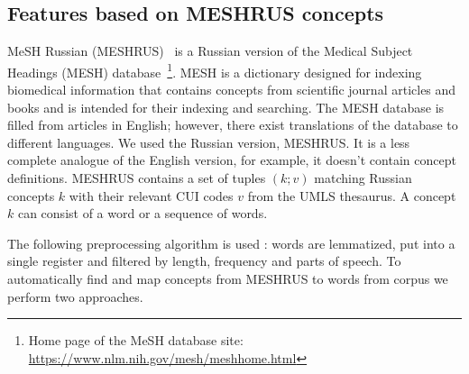 \documentclass[a4paper,fleqn,longmktitle]{cas-dc}
\begin{document}
\subsection*{Features based on MESHRUS concepts}\label{subsec:meshrus_features}
 MeSH Russian (MESHRUS)~\cite{NLM} is a Russian version of the Medical Subject Headings (MESH) database~\footnote{Home page of the MeSH database site: \url{https://www.nlm.nih.gov/mesh/meshhome.html}}. MESH is a dictionary designed for indexing biomedical information that contains concepts from scientific journal articles and books and is intended for their indexing and searching. The MESH database is filled from articles in English; however, there exist translations of the database to different languages. We used the Russian version, MESHRUS. It is a less complete analogue of the English version, for example, it doesn't contain concept definitions.
MESHRUS contains a set of tuples $(k;v)$ matching Russian concepts $k$ with their relevant CUI codes $v$ from the UMLS thesaurus. A concept $k$ can consist of a word or a sequence of words. %

The following preprocessing algorithm is used%
: words are lemmatized, put into a single register and filtered by length, frequency and parts of speech. 
To automatically find and map concepts from MESHRUS to words from corpus we perform two approaches.  %
\end{document}
